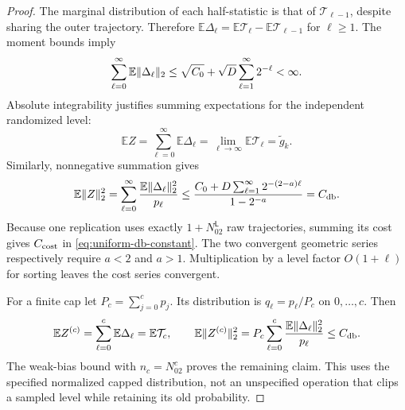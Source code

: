 \documentclass[11pt]{article}
\newcommand{\E}{\mathbb E}
\newcommand{\1}{\mathbf 1}
\DeclarePairedDelimiter{\norm}{\lVert}{\rVert}
\newcommand{\db}{\mathrm{db}}
\theoremstyle{definition}
\begin{document}
\begin{proof}
The marginal distribution of each half-statistic is that of $\mathcal T_{\ell-1}$, despite sharing the outer trajectory. Therefore
$\E\Delta_\ell=\E \mathcal T_\ell-\E \mathcal T_{\ell-1}$ for $\ell\ge1$. The moment bounds imply
\[
 \sum_{\ell=0}^\infty\E\norm{\Delta_\ell}_2
 \le\sqrt{C_0}+\sqrt D\sum_{\ell=1}^\infty2^{-\ell}<\infty.
\]
Absolute integrability justifies summing expectations for the independent randomized level:
\[
 \E Z=\sum_{\ell=0}^\infty\E\Delta_\ell
 =\lim_{\ell\to\infty}\E \mathcal T_\ell=\widetilde g_k.
\]
Similarly, nonnegative summation gives
\[
 \E\norm{Z}_2^2
 =\sum_{\ell=0}^\infty\frac{\E\norm{\Delta_\ell}_2^2}{p_\ell}
 \le\frac{C_0+D\sum_{\ell=1}^\infty2^{-(2-a)\ell}}{1-2^{-a}}
 =C_{\db}.
\]
Because one replication uses exactly $1+N_02^{\mathsf L}$ raw trajectories, summing its cost gives $C_{\rm cost}$ in \eqref{eq:uniform-db-constant}. The two convergent geometric series respectively require $a<2$ and $a>1$. Multiplication by a level factor $O(1+\ell)$ for sorting leaves the cost series convergent.

For a finite cap let $P_c=\sum_{j=0}^cp_j$. Its distribution is $q_\ell=p_\ell/P_c$ on $0,\ldots,c$. Then
\[
 \E Z^{(c)}=\sum_{\ell=0}^c\E\Delta_\ell=\E \mathcal T_c,
 \qquad
 \E\norm{Z^{(c)}}_2^2=P_c\sum_{\ell=0}^c
 \frac{\E\norm{\Delta_\ell}_2^2}{p_\ell}\le C_{\db}.
\]
The weak-bias bound with $n_c=N_02^c$ proves the remaining claim. This uses the specified normalized capped distribution, not an unspecified operation that clips a sampled level while retaining its old probability.
\end{proof}
\end{document}
